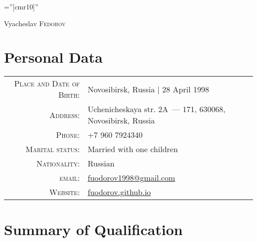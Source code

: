 \documentclass[a4paper,12pt]{article}
\begin{document}

\pagestyle{empty} %

\font\fb=''[cmr10]'' %

\par{\centering
		{\Huge Vyacheslav \textsc{Fedorov}
	}\bigskip\par}

\section{Personal Data}

\begin{tabular}{rl}
    \textsc{Place and Date of Birth:} & Novosibirsk, Russia  | 28 April 1998 \\
    \textsc{Address:}   & Uchenicheskaya str. 2A~--- 171, 630068, Novosibirsk, Russia \\
    \textsc{Phone:}     & +7 960 7924340\\
    \textsc{Marital status:}     & Married with one children\\
    \textsc{Nationality:}     & Russian\\
    \textsc{email:}     & \href{mailto:fuodorov1998@gmail.com}{fuodorov1998@gmail.com}\\
    \textsc{Website:}    & \href{https://fuodorov.github.io/}{fuodorov.github.io}\\
\end{tabular}



\section{Summary of Qualification}
\end{document}
